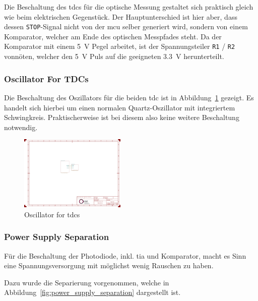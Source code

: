 Die Beschaltung des \acrshort{tdc}s für die optische Messung gestaltet sich praktisch gleich wie beim elektrischen
Gegenstück. Der Hauptunterschied ist hier aber, dass dessen \lstinline|STOP|-Signal nicht von der \acrshort{mcu} selber generiert
wird, sondern von einem Komparator, welcher am Ende des optischen Messpfades steht. Da der Komparator mit einem 5~V Pegel
arbeitet, ist der Spannungsteiler \lstinline|R1| / \lstinline|R2| vonnöten, welcher den 5~V Puls auf die geeigneten 3.3~V
herunterteilt.

\subsubsection{Oscillator For TDCs}

Die Beschaltung des Oszillators für die beiden \acrshort{tdc} ist in Abbildung~\ref{fig:oscillator_tdc} gezeigt. Es
handelt sich hierbei um einen normalen Quartz-Oszillator mit integriertem Schwingkreis. Praktischerweise ist bei diesem
also keine weitere Beschaltung notwendig.

\begin{figure}[H]
    \centering
    \includegraphics[page=2, trim=80 90 930 550, clip, width=0.45\textwidth]{attachments/schematic.pdf}
    \caption{Oscillator for \acrshort{tdc}s}\label{fig:oscillator_tdc}
\end{figure}

\subsubsection{Power Supply Separation}

Für die Beschaltung der Photodiode, inkl. \acrshort{tia} und Komparator, macht es Sinn eine Spannungsversorgung mit
möglichst wenig Rauschen zu haben.

Dazu wurde die Separierung vorgenommen, welche in Abbildung~\ref{fig:power_supply_separation} dargestellt ist.

